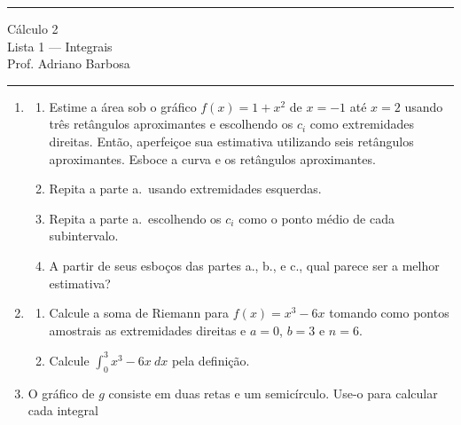 \documentclass{article}
\begin{document}
\noindent{}\rule{\textwidth}{0.4pt}
\begin{center}
	C\'alculo 2\\
	Lista 1 --- Integrais \\
	\vspace{0.2cm}
	Prof. Adriano Barbosa
\end{center}
\noindent{}\rule{\textwidth}{0.4pt}

\begin{enumerate}
\item
\begin{enumerate}[label=\alph*.]
	\item Estime a \'area sob o gr\'afico $f(x) = 1 + x^2$ de $x = -1$ at\'e $x = 2$
		usando tr\^es ret\^angulos aproximantes e escolhendo os $c_i$ como
		extremidades direitas. Ent\~ao, aperfei\c{c}oe sua estimativa utilizando seis
		ret\^angulos aproximantes. Esboce a curva e os ret\^angulos aproximantes.
	\item Repita a parte a.\ usando extremidades esquerdas.
	\item Repita a parte a.\ escolhendo os $c_i$ como o ponto m\'edio de cada subintervalo.
	\item A partir de seus esbo\c{c}os das partes a., b., e c., qual parece ser a melhor estimativa?
\end{enumerate}

\item
\begin{enumerate}[label=\alph*.]
	\item Calcule a soma de Riemann para $f(x) = x^3 - 6x$ tomando como pontos
		amostrais as extremidades direitas e $a = 0$, $b = 3$ e $n = 6$.
	\item Calcule $\int_0^3 x^3 - 6x\ dx$ pela defini\c{c}\~ao.
\end{enumerate}

\item O gr\'afico de $g$ consiste em duas retas e um semic\'{i}rculo. Use-o para
	calcular cada integral



\end{enumerate}
\end{document}
